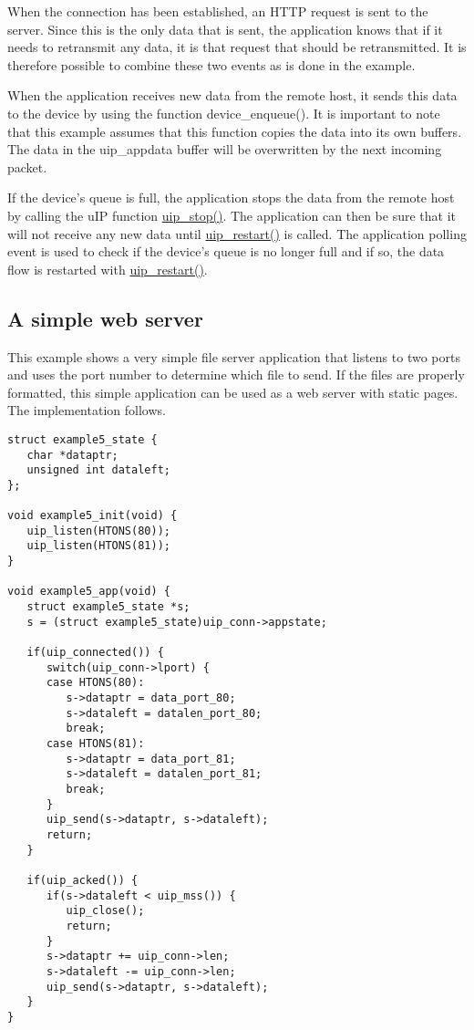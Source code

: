 When the connection has been established, an HTTP request is sent to the server. Since this is the only data that is sent, the application knows that if it needs to retransmit any data, it is that request that should be retransmitted. It is therefore possible to combine these two events as is done in the example.

When the application receives new data from the remote host, it sends this data to the device by using the function device\_\-enqueue(). It is important to note that this example assumes that this function copies the data into its own buffers. The data in the uip\_\-appdata buffer will be overwritten by the next incoming packet.

If the device's queue is full, the application stops the data from the remote host by calling the u\-IP function \hyperlink{a00064_g0a8bb9d6d0f1f56852ccfccbbad6c5d8}{uip\_\-stop()}. The application can then be sure that it will not receive any new data until \hyperlink{a00064_g81ac47cee1c18f6aa479044069db7ca3}{uip\_\-restart()} is called. The application polling event is used to check if the device's queue is no longer full and if so, the data flow is restarted with \hyperlink{a00064_g81ac47cee1c18f6aa479044069db7ca3}{uip\_\-restart()}.\hypertarget{main_example5}{}\subsection{A simple web server}\label{main_example5}
This example shows a very simple file server application that listens to two ports and uses the port number to determine which file to send. If the files are properly formatted, this simple application can be used as a web server with static pages. The implementation follows.



\footnotesize\begin{verbatim}struct example5_state {
   char *dataptr;
   unsigned int dataleft;
};

void example5_init(void) {
   uip_listen(HTONS(80));
   uip_listen(HTONS(81));
}

void example5_app(void) {
   struct example5_state *s;
   s = (struct example5_state)uip_conn->appstate;
   
   if(uip_connected()) {
      switch(uip_conn->lport) {
      case HTONS(80):
         s->dataptr = data_port_80;
         s->dataleft = datalen_port_80;
         break;
      case HTONS(81):
         s->dataptr = data_port_81;
         s->dataleft = datalen_port_81;
         break;
      }
      uip_send(s->dataptr, s->dataleft);
      return;      
   }

   if(uip_acked()) {
      if(s->dataleft < uip_mss()) {
         uip_close();
         return;
      }
      s->dataptr += uip_conn->len;
      s->dataleft -= uip_conn->len;
      uip_send(s->dataptr, s->dataleft);      
   }
}
\end{verbatim}
\normalsize


